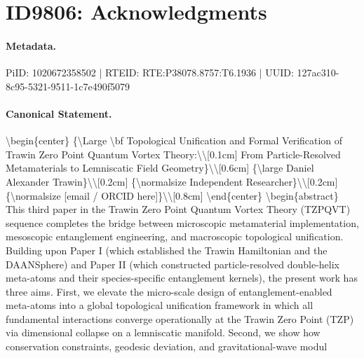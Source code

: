 \section*{ID9806: Acknowledgments}
\paragraph{Metadata.}
PiID: 1020672358502 | RTEID: RTE:P38078.8757:T6.1936 | UUID: 127ac310-8c95-5321-9511-1c7e490f5079

\paragraph{Canonical Statement.}
\textbackslash{}begin\{center\} \{\textbackslash{}Large \textbackslash{}bf Topological Unification and Formal Verification of Trawin Zero Point Quantum Vortex Theory:\textbackslash{}\textbackslash{}[0.1cm] From Particle-Resolved Metamaterials to Lemniscatic Field Geometry\}\textbackslash{}\textbackslash{}[0.6cm] \{\textbackslash{}large Daniel Alexander Trawin\}\textbackslash{}\textbackslash{}[0.2cm] \{\textbackslash{}normalsize Independent Researcher\}\textbackslash{}\textbackslash{}[0.2cm] \{\textbackslash{}normalsize [email / ORCID here]\}\textbackslash{}\textbackslash{}[0.8cm] \textbackslash{}end\{center\} \textbackslash{}begin\{abstract\} This third paper in the Trawin Zero Point Quantum Vortex Theory (TZPQVT) sequence completes the bridge between microscopic metamaterial implementation, mesoscopic entanglement engineering, and macroscopic topological unification. Building upon Paper I (which established the Trawin Hamiltonian and the DAANSphere) and Paper II (which constructed particle-resolved double-helix meta-atoms and their species-specific entanglement kernels), the present work has three aims. First, we elevate the micro-scale design of entanglement-enabled meta-atoms into a global topological unification framework in which all fundamental interactions converge operationally at the Trawin Zero Point (TZP) via dimensional collapse on a lemniscatic manifold. Second, we show how conservation constraints, geodesic deviation, and gravitational-wave modul

